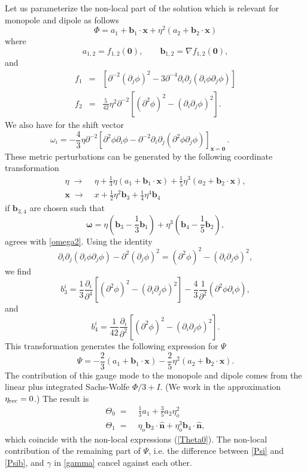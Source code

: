 \documentclass[12pt]{article}
\numberwithin{equation}{section}
\def\bsb{\boldsymbol}
\def\bea{\begin{eqnarray}}
\def\eea{\end{eqnarray}}
\def\be{\begin{equation}}
\def\ee{\end{equation}}
\def\d{\partial}
\def\n{\bsb{\hat n}}
\def\x{{\bsb x}}
\begin{document}
{Let us parameterize the non-local part of the solution which is relevant for monopole and dipole as follows
\be
\label{Phi2}
\Phi = a_1 + \bsb b_1 \cdot \bsb x + \eta^2(a_2+\bsb b_2 \cdot \bsb x)
\ee
where
\be
a_{1,2} = f_{1,2}(\bsb 0),\qquad \bsb b_{1,2} = \nabla f_{1,2}(\bsb 0),
\ee
and 
\bea
f_1 &=& \left[\d^{-2}(\d_j\phi)^2 -3\d^{-4}\d_i\d_j(\d_i\phi\d_j\phi) \right]\\[10pt]
f_2 &=& \frac{5}{42}\eta^2\d^{-2}\left[(\d^2\phi)^2-(\d_i\d_j\phi)^2\right].
\eea
We also have for the shift vector 
\be\label{omega2}
  \omega_{i} = - \frac{4}{3}\eta \d^{-2} \left[\d^2 \phi \d_i \phi
    - \d^{-2} \d_i\d_j
    (\d^2\phi \d_j\phi) \right]_{\x=\bsb 0} \, .~~~~~~~~~~~~~~~~~ 
\ee
These metric perturbations can be generated by the following coordinate transformation
\be\label{trans}
\begin{split}
\eta\; \to\; 
& \eta + \frac{1}{3}\eta (a_1 + \bsb b_1 \cdot \bsb x) +\frac{1}{5} \eta^3(a_2+\bsb b_2 \cdot \bsb x),\\[10pt]
\x \;\to\; & x + \frac{1}{2} \eta^2 \bsb b_3 + \frac{1}{4}\eta^4\bsb b_4 
\end{split}
\ee
if $\bsb b_{3,4}$ are chosen such that
\be
\bsb{\omega} = \eta(\bsb b_3 -\frac{1}{3}\bsb b_1) +\eta^3 (\bsb b_4 -\frac{1}{5} \bsb b_2),
\ee
agrees with \eqref{omega2}. Using the identity
\be
\d_i\d_j(\d_i\phi\d_j\phi)-\d^2(\d_j\phi)^2 = (\d^2\phi)^2-(\d_i\d_j\phi)^2,
\ee
we find
\be
b_3^i =\frac{1}{3}\frac{\d_i}{\d^4}[(\d^2\phi)^2-(\d_i\d_j\phi)^2]-\frac{4}{3} \frac{1}{\d^2}(\d^2\phi \d_i \phi),
\ee
and 
\be
b_4^i = \frac{1}{42}\frac{\d_i}{\d^2}[(\d^2\phi)^2-(\d_i\d_j\phi)^2].
\ee
This transformation generates the following expression for $\Psi$
\be
\label{Psib}
\Psi = -\frac{2}{3}(a_1 + \bsb b_1 \cdot \bsb x) - \frac{2}{5}\eta^2(a_2+\bsb b_2 \cdot \bsb x).
\ee
The contribution of this gauge mode to the monopole and dipole comes from the linear plus integrated Sachs-Wolfe $\Phi/3 + I$. (We work in the approximation $\eta_{\rm rec}=0$.) The result is
\be
\begin{split}
\Theta_0 \;=\;& \frac{1}{3}a_1+\frac{3}{5} a_2 \eta_o^2\\[10pt]
\Theta_1 \;=\;& \eta_o \bsb b_3 \cdot \n + \eta_o^3 \bsb b_4\cdot \n,
\end{split}
\ee
which coincide with the non-local expressions (\ref{Theta0}). The non-local contribution of the remaining part of $\Psi$, i.e. the difference between \eqref{Psi} and \eqref{Psib}, and $\gamma$ in \eqref{gamma} cancel against each other.

}
\end{document}
